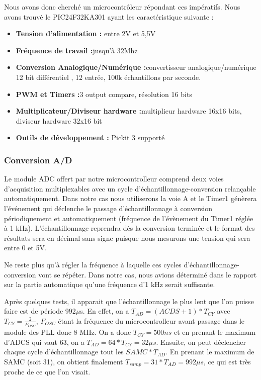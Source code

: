 \documentclass[11pt, french]{article} %
\begin{document}
Nous avons donc cherché un microcontrôleur répondant ces impératifs. Nous avons trouvé le PIC24F32KA301 ayant les caractéristique suivante :
\begin{itemize}
\item \textbf{Tension d'alimentation :} entre 2V et 5,5V
\item \textbf{Fréquence de travail :}jusqu'à 32Mhz
\item \textbf{Conversion Analogique/Numérique :}convertisseur analogique/numérique 12 bit différentiel , 12 entrée, 100k échantillons par seconde. 
\item \textbf{PWM et Timers :}3 output compare, résolution 16 bits
\item \textbf{Multiplicateur/Diviseur hardware :}multiplieur hardware 16x16 bits, diviseur hardware 32x16 bit
\item \textbf{Outils de développement :} Pickit 3 supporté

\end{itemize}

\subsubsection{Conversion A/D}

Le module ADC offert par notre microcontrolleur comprend deux voies d'acquisition multiplexables avec un cycle d'échantillonnage-conversion relançable automatiquement. Dans notre cas nous utiliserons la voie A et le Timer1 génèrera l'événement qui déclenche le passage d'échantillonnage à conversion périodiquement et automatiquement (fréquence de l'évènement du Timer1 réglée à 1 kHz). L'échantillonnage reprendra dès la conversion terminée et le format des résultats sera en décimal sans signe puisque nous mesurons une tension qui sera entre 0 et 5V. 

\vspace{0.5cm}

Ne reste plus qu'à régler la fréquence à laquelle ces cycles d'échantillonnage-conversion vont se répéter. Dans notre cas, nous avions déterminé dans le rapport sur la partie automatique qu'une fréquence d'1 kHz serait suffisante. 

\vspace{0.5cm}

Après quelques tests, il apparait que l'échantillonnage le plus lent que l'on puisse faire est de période 992$\mu$s. En effet, on a $T_{AD} = (ACDS+1) * T_{CY}$ avec $T_{CY} = \frac{2}{F_{OSC}}$, $F_{OSC}$ étant la fréquence du microcontrolleur avant passage dans le module des PLL donc 8 MHz. On a donc $T_{CY} = 500 ns$ et en prenant le maximum d'ADCS qui vaut 63, on a $T_{AD} = 64 * T_{CY} = 32 \mu s$. Ensuite, on peut déclencher chaque cycle d'échantillonnage tout les $SAMC * T_{AD}$. En prenant le maximum de SAMC (soit 31), on obtient finalement $T_{samp} = 31 * T_{AD} = 992 \mu s$, ce qui est très proche de ce que l'on visait.  
\end{document}
